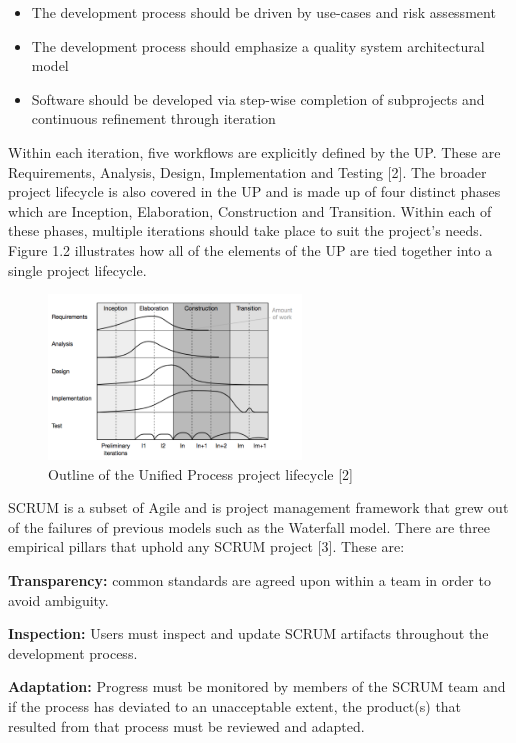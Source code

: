 \begin{itemize}
  \item The development process should be driven by use-cases and risk assessment
  \item The development process should emphasize a quality system architectural model 
  \item Software should be developed via step-wise completion of subprojects and continuous refinement through iteration
\end{itemize}

Within each iteration, five workflows are explicitly defined by the UP.
These are Requirements, Analysis, Design, Implementation and Testing
{[}2{]}. The broader project lifecycle is also covered in the UP and is
made up of four distinct phases which are Inception, Elaboration,
Construction and Transition. Within each of these phases, multiple
iterations should take place to suit the project's needs. Figure 1.2
illustrates how all of the elements of the UP are tied together into a
single project lifecycle.

\begin{figure}[H]
      \centering
      \includegraphics[trim = 0 0 0 0, clip, width=0.6\textwidth]{TempImg/UP.png}
      \caption{Outline of the Unified Process project lifecycle [2]}
 \end{figure}

SCRUM is a subset of Agile and is project management framework that grew
out of the failures of previous models such as the Waterfall model.
There are three empirical pillars that uphold any SCRUM project {[}3{]}.
These are:

\textbf{Transparency:} common standards are agreed upon within a team in
order to avoid ambiguity.

\textbf{Inspection:} Users must inspect and update SCRUM artifacts
throughout the development process.

\textbf{Adaptation:} Progress must be monitored by members of the SCRUM
team and if the process has deviated to an unacceptable extent, the
product(s) that resulted from that process must be reviewed and adapted.

